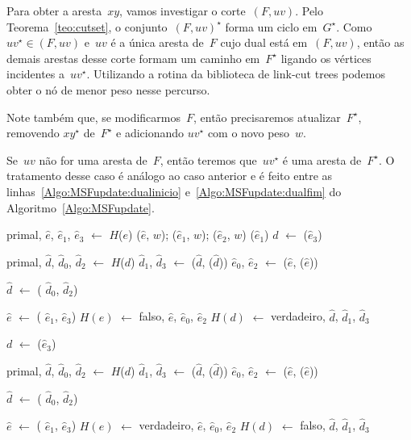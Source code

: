 Para obter a aresta~$xy$, vamos investigar o corte~$(F, uv)$.
Pelo Teorema~\ref{teo:cutset}, o conjunto~$(F, uv)^\star$ forma um ciclo em~$G^\star$.
Como~$uv^\star\in(F, uv)$ e~$uv$ é a única aresta de~$F$ cujo dual está em~$(F, uv)$, então as demais arestas desse corte formam um caminho em~$F^\star$ ligando os vértices incidentes a~$uv^\star$.
Utilizando a rotina \linkcutMin{}  da biblioteca de link-cut trees podemos obter o nó de menor peso nesse percurso.

Note também que, se modificarmos~$F$, então precisaremos atualizar~$F^\star$, removendo $xy^\star$ de~$F^\star$ e adicionando $uv^\star$ com o novo peso~$w$.

Se~$uv$ não for uma aresta de~$F$, então teremos que~$uv^\star$ é uma aresta de~$F^\star$.
O tratamento desse caso é análogo ao caso anterior e é feito entre as linhas~\ref{Algo:MSFupdate:dualinicio} e~\ref{Algo:MSFupdate:dualfim} do Algoritmo~\ref{Algo:MSFupdate}.

\begin{algorithm}[htb]
\caption{\MSFupdate($G$, $e$, $w$)}
\label{Algo:MSFupdate}
\begin{algorithmic}[1]
\State primal, $\hat e$, $\hat e_1$, $\hat e_3$ $\gets$ $H$($e$)
\State \LCOAddCost($\hat e$, $w$); \LCOAddCost($\hat e_1$, $w$); \LCOAddCost($\hat e_2$, $w$)
\State \LCOEvert($\hat e_1$)
\State $d$ $\gets$ \LCOMin($\hat e_3$)

\State primal, $\hat d$, $\hat d_0$, $\hat d_2$ $\gets$ $H$($d$)
\State $\hat d_1$, $\hat d_3$ $\gets$ \LCOSplit($\hat d$, \LCOParent($\hat d$))
\State $\hat e_0$, $\hat e_2$ $\gets$ \LCOSplit($\hat e$, \LCOParent($\hat e$))


\State $\hat d$ $\gets$ \LCOMerge( $\hat d_0$, $\hat d_2$)

\State $\hat e$ $\gets$ \LCOMerge( $\hat e_1$, $\hat e_3$)
\State $H(e)$ $\gets$ falso, $\hat e$, $\hat e_0$, $\hat e_2$
\State $H(d)$ $\gets$ verdadeiro, $\hat d$, $\hat d_1$, $\hat d_3$

\EndIf

\Else
\State $d$ $\gets$ \LCOMax($\hat e_3$)

\State primal, $\hat d$, $\hat d_0$, $\hat d_2$ $\gets$ $H$($d$)
\State $\hat d_1$, $\hat d_3$ $\gets$ \LCOSplit($\hat d$, \LCOParent($\hat d$))
\State $\hat e_0$, $\hat e_2$ $\gets$ \LCOSplit($\hat e$, \LCOParent($\hat e$))


\State $\hat d$ $\gets$ \LCOMerge( $\hat d_0$, $\hat d_2$)

\State $\hat e$ $\gets$ \LCOMerge( $\hat e_1$, $\hat e_3$)
\State $H(e)$ $\gets$ verdadeiro, $\hat e$, $\hat e_0$, $\hat e_2$
\State $H(d)$ $\gets$ falso, $\hat d$, $\hat d_1$, $\hat d_3$

\EndIf
\EndIf
\end{algorithmic}
\end{algorithm}

